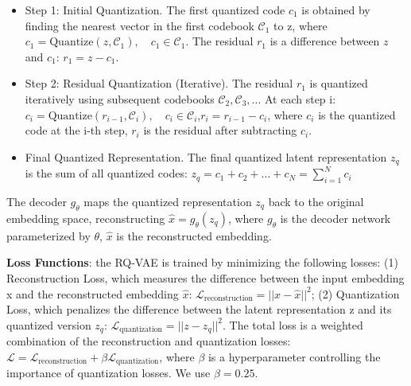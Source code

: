 \begin{itemize}
\item Step 1: Initial Quantization.
The first quantized code
$c_1$ is obtained by finding the nearest vector in the first codebook $\mathcal{C}_1$ to z, where $c_1 = \text{Quantize}(z, \mathcal{C}_1), \quad c_1 \in \mathcal{C}_1$.
The residual $r_1$ is a difference between $z$ and $c_1$: $r_1 = z - c_1$.
\item Step 2: Residual Quantization (Iterative).
The residual $r_1$ is quantized iteratively using subsequent codebooks
$\mathcal{C}_2, \mathcal{C}_3, \dots$ %
At each step i: $c_i = \text{Quantize}(r_{i-1}, \mathcal{C}_i), \quad c_i \in \mathcal{C}_i$,$r_i = r_{i-1} - c_i$,
where $c_i$ is the quantized code at the i-th step, $r_i$ is the residual after subtracting $c_i$.

\item Final Quantized Representation.
The final quantized latent representation $z_q$ is the sum of all quantized codes:
$z_q = c_1 + c_2 + \dots + c_N = \sum_{i=1}^N c_i$
\end{itemize}
The decoder $g_\theta$ maps the quantized representation $z_q$ back to the original embedding space, reconstructing $\hat{x} = g_\theta(z_q)$,
where $g_\theta$ is the decoder network parameterized by $\theta$, $\hat{x}$ is the reconstructed embedding.

\textbf{Loss Functions}: the RQ-VAE is trained by minimizing the following losses: (1) Reconstruction Loss, which measures the difference between the input embedding x and the reconstructed embedding $\hat{x}$: 
$\mathcal{L}_{\text{reconstruction}} = ||x - \hat{x}||^2$;
(2) Quantization Loss, which penalizes the difference between the latent representation z and its quantized version $z_q$:
$\mathcal{L}_{\text{quantization}} = ||z - z_q||^2$.
The total loss is a weighted combination of the reconstruction and quantization losses:
$\mathcal{L} = \mathcal{L}_{\text{reconstruction}} + \beta \mathcal{L}_{\text{quantization}}$,
where $\beta$ is a hyperparameter controlling the importance of quantization losses. We use $\beta=0.25$.

